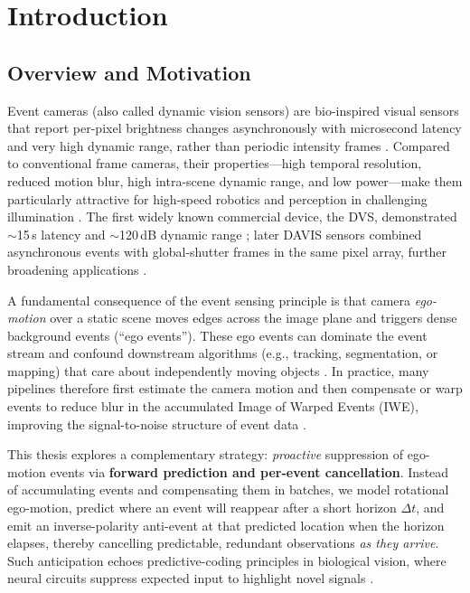\chapter{Introduction}

\section{Overview and Motivation}

Event cameras (also called dynamic vision sensors) are bio-inspired visual sensors that report per-pixel brightness changes asynchronously with microsecond latency and very high dynamic range, rather than periodic intensity frames \cite{Gallego2020Survey}. Compared to conventional frame cameras, their properties—high temporal resolution, reduced motion blur, high intra-scene dynamic range, and low power—make them particularly attractive for high-speed robotics and perception in challenging illumination \cite{Gallego2020Survey,Lichtsteiner2008DVS,Brandli2014DAVIS}. The first widely known commercial device, the DVS, demonstrated $\sim$15\,\textmu s latency and $\sim$120\,dB dynamic range \cite{Lichtsteiner2008DVS}; later DAVIS sensors combined asynchronous events with global-shutter frames in the same pixel array, further broadening applications \cite{Brandli2014DAVIS}. 

A fundamental consequence of the event sensing principle is that camera \emph{ego-motion} over a static scene moves edges across the image plane and triggers dense background events (``ego events''). These ego events can dominate the event stream and confound downstream algorithms (e.g., tracking, segmentation, or mapping) that care about independently moving objects \cite{Stoffregen2019Segmentation,Gallego2020Survey}. In practice, many pipelines therefore first estimate the camera motion and then compensate or warp events to reduce blur in the accumulated Image of Warped Events (IWE), improving the signal-to-noise structure of event data \cite{Gallego2018CMax,Bardow2016SOFIE}. 

This thesis explores a complementary strategy: \emph{proactive} suppression of ego-motion events via \textbf{forward prediction and per-event cancellation}. Instead of accumulating events and compensating them in batches, we model rotational ego-motion, predict where an event will reappear after a short horizon $\Delta t$, and emit an inverse-polarity anti-event at that predicted location when the horizon elapses, thereby cancelling predictable, redundant observations \emph{as they arrive}. Such anticipation echoes predictive-coding principles in biological vision, where neural circuits suppress expected input to highlight novel signals \cite{Hosoya2005Dynamic,Rao1999Predictive}. 

